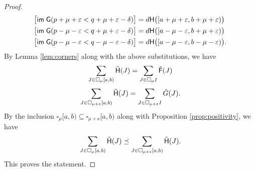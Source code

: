 \documentclass[12pt]{article}
\begin{document}
\begin{proof}
\begin{align*}
\big[ \mathsf{im}\; {\mathsf{G}} ( p+\mu+\varepsilon < q+\mu+\varepsilon-\delta) \big] &= 
	d {\mathsf{H}} \big( [a+\mu+\varepsilon, b+\mu+\varepsilon) \big) \\
\big[ \mathsf{im}\; {\mathsf{G}} ( p-\mu-\varepsilon < q+\mu+\varepsilon-\delta) \big] &= d {\mathsf{H}} \big( [a-\mu-\varepsilon, b+\mu+\varepsilon) \big) \\
\big[ \mathsf{im}\; {\mathsf{G}} ( p-\mu-\varepsilon < q-\mu-\varepsilon-\delta) \big] &= d {\mathsf{H}} \big( [a-\mu-\varepsilon, b-\mu-\varepsilon) \big).
\end{align*}
By Lemma \ref{lem:corners} along with the above substitutions, we have
$$\sum_{J \in \square_{\mu}[a,b)}  \tilde {{\mathsf{H}}} (J) = \sum_{J \in \square_{\mu} I} \tilde{{\mathsf{F}}}(J)$$
$$\sum_{J \in \square_{\mu+\varepsilon}[a,b)} \tilde {{\mathsf{H}}} (J) = \sum_{J \in \square_{\mu+\varepsilon} I } \tilde{G}(J).$$ 
By the inclusion $\square_{\mu} [a,b) \subseteq \square_{\mu + \ee} [a,b) $ along with Proposition \ref{prop:positivity}, we have 
$$\sum_{J \in \square_{\mu} [a,b)} \tilde {{\mathsf{H}}} (J) \preceq 
\sum_{J \in \square_{\mu+\varepsilon} [a,b)} \tilde {{\mathsf{H}}} (J).$$
This proves the statement.


\end{proof}
\end{document}
